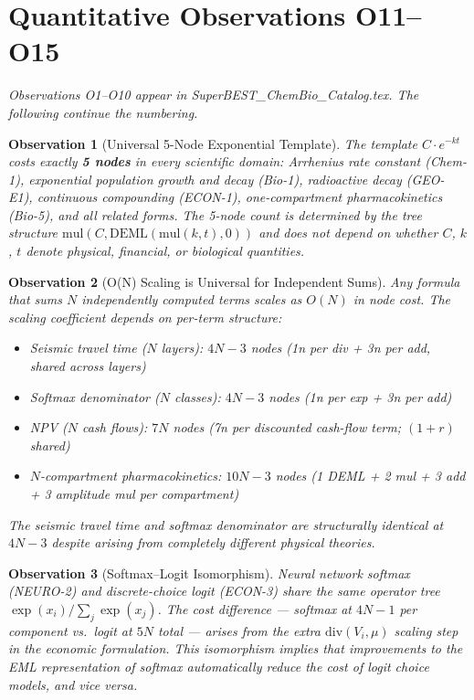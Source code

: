 \documentclass[12pt,a4paper]{article}
\newtheorem{observation}{Observation}[section]
\theoremstyle{definition}
\begin{document}
\section{Quantitative Observations O11--O15}
\label{sec:observations}

\noindent
\textit{Observations O1--O10 appear in SuperBEST\_ChemBio\_Catalog.tex.
The following continue the numbering.}

\begin{observation}[Universal 5-Node Exponential Template]
\label{obs:O11}
The template $C \cdot e^{-kt}$ costs exactly \textbf{5 nodes} in every
scientific domain: Arrhenius rate constant (Chem-1), exponential population
growth and decay (Bio-1), radioactive decay (GEO-E1), continuous compounding
(ECON-1), one-compartment pharmacokinetics (Bio-5), and all related forms.
The 5-node count is determined by the tree structure
$\mathrm{mul}(C, \mathrm{DEML}(\mathrm{mul}(k, t), 0))$
and does not depend on whether $C$, $k$, $t$ denote physical, financial,
or biological quantities.
\end{observation}

\begin{observation}[O(N) Scaling is Universal for Independent Sums]
\label{obs:O12}
Any formula that sums $N$ independently computed terms scales as $O(N)$
in node cost.  The scaling coefficient depends on per-term structure:
\begin{itemize}[noitemsep]
\item Seismic travel time ($N$ layers): $4N - 3$ nodes
  (1n per div + 3n per add, shared across layers)
\item Softmax denominator ($N$ classes): $4N - 3$ nodes
  (1n per exp + 3n per add)
\item NPV ($N$ cash flows): $7N$ nodes
  (7n per discounted cash-flow term; $(1+r)$ shared)
\item $N$-compartment pharmacokinetics: $10N - 3$ nodes
  (1 DEML + 2 mul + 3 add + 3 amplitude mul per compartment)
\end{itemize}
The seismic travel time and softmax denominator are structurally identical
at $4N - 3$ despite arising from completely different physical theories.
\end{observation}

\begin{observation}[Softmax--Logit Isomorphism]
\label{obs:O13}
Neural network softmax (NEURO-2) and discrete-choice logit (ECON-3) share
the same operator tree $\exp(x_i) / \sum_j \exp(x_j)$.
The cost difference --- softmax at $4N - 1$ per component vs.\ logit at
$5N$ total --- arises from the extra $\mathrm{div}(V_i, \mu)$ scaling step
in the economic formulation.
This isomorphism implies that improvements to the EML representation of
softmax automatically reduce the cost of logit choice models, and vice versa.
\end{observation}
\end{document}
